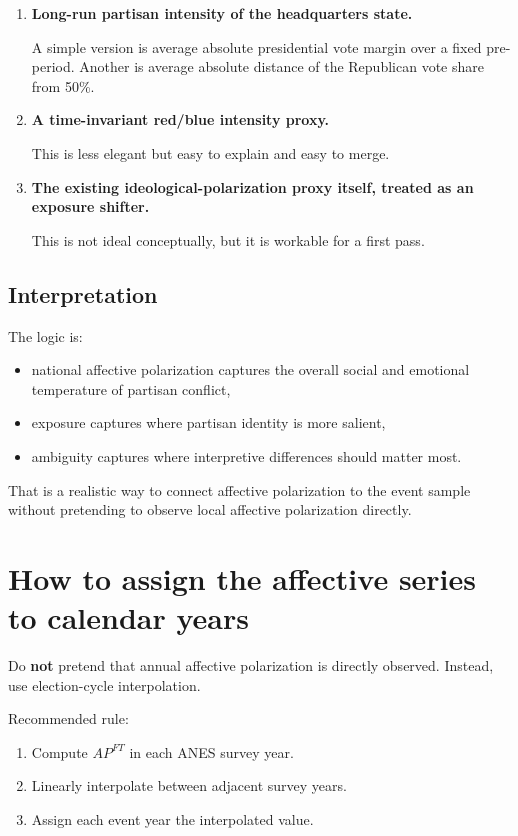 \documentclass[12pt]{article}
\begin{document}
\begin{enumerate}[leftmargin=1.5em]
    \item \textbf{Long-run partisan intensity of the headquarters state.}
    
    A simple version is average absolute presidential vote margin over a fixed pre-period. Another is average absolute distance of the Republican vote share from 50\%.

    \item \textbf{A time-invariant red/blue intensity proxy.}
    
    This is less elegant but easy to explain and easy to merge.

    \item \textbf{The existing ideological-polarization proxy itself, treated as an exposure shifter.}
    
    This is not ideal conceptually, but it is workable for a first pass.
\end{enumerate}

\subsection{Interpretation}

The logic is:
\begin{itemize}[leftmargin=1.5em]
    \item national affective polarization captures the overall social and emotional temperature of partisan conflict,
    \item exposure captures where partisan identity is more salient,
    \item ambiguity captures where interpretive differences should matter most.
\end{itemize}

That is a realistic way to connect affective polarization to the event sample without pretending to observe local affective polarization directly.

\section{How to assign the affective series to calendar years}

Do \textbf{not} pretend that annual affective polarization is directly observed. Instead, use election-cycle interpolation.

Recommended rule:
\begin{enumerate}[leftmargin=1.5em]
    \item Compute $AP^{FT}$ in each ANES survey year.
    \item Linearly interpolate between adjacent survey years.
    \item Assign each event year the interpolated value.
\end{enumerate}
\end{document}
